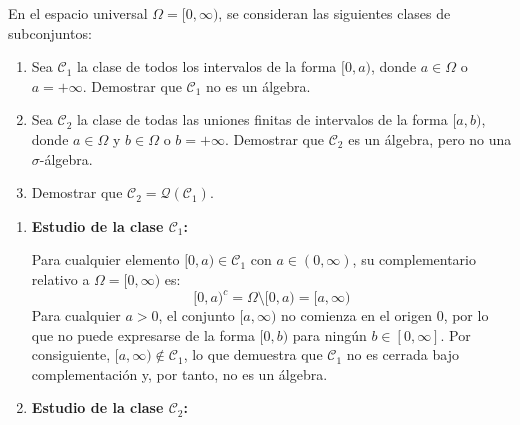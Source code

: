 \begin{problema}
En el espacio universal $\Omega = [0,\infty)$, se consideran las siguientes clases de subconjuntos:
\begin{enumerate}[label=\alph*)]
    \item Sea $\mathcal{C}_1$ la clase de todos los intervalos de la forma $[0,a)$, donde $a \in \Omega$ o $a = +\infty$. Demostrar que $\mathcal{C}_1$ no es un álgebra.
    \item Sea $\mathcal{C}_2$ la clase de todas las uniones finitas de intervalos de la forma $[a,b)$, donde $a \in \Omega$ y $b \in \Omega$ o $b = +\infty$. Demostrar que $\mathcal{C}_2$ es un álgebra, pero no una $\sigma$-álgebra.
    \item Demostrar que $\mathcal{C}_2 = \mathcal{Q}(\mathcal{C}_1)$.
\end{enumerate}

\tcblower

\begin{enumerate}[label=\alph*)]
    \item \textbf{Estudio de la clase $\mathcal{C}_1$:}
    
    Para cualquier elemento $[0,a) \in \mathcal{C}_1$ con $a \in (0,\infty)$, su complementario relativo a $\Omega = [0,\infty)$ es:
    \[
        [0,a)^c = \Omega \setminus [0,a) = [a,\infty)
    \]
    Para cualquier $a > 0$, el conjunto $[a,\infty)$ no comienza en el origen $0$, por lo que no puede expresarse de la forma $[0,b)$ para ningún $b \in [0,\infty]$. Por consiguiente, $[a,\infty) \notin \mathcal{C}_1$, lo que demuestra que $\mathcal{C}_1$ no es cerrada bajo complementación y, por tanto, no es un álgebra.

    \item \textbf{Estudio de la clase $\mathcal{C}_2$:}
    

\end{enumerate}
\end{problema}
